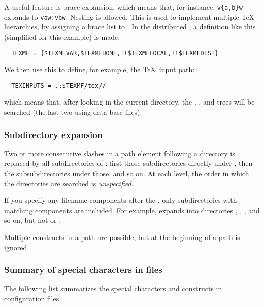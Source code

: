 \documentclass{article}
\begin{document}
A useful feature is brace expansion, which means that, for instance,
\verb+v{a,b}w+ expands to \verb+vaw:vbw+. Nesting is allowed.
This is used to implement multiple \TeX{} hierarchies, by
assigning a brace list to .
In the distributed , a definition like this
(simplified for this example) is made:
\begin{verbatim}
  TEXMF = {$TEXMFVAR,$TEXMFHOME,!!$TEXMFLOCAL,!!$TEXMFDIST}
\end{verbatim}
We then use this to define, for example, the \TeX\ input path:
\begin{verbatim}
  TEXINPUTS = .;$TEXMF/tex//
\end{verbatim}
which means that, after looking in the current directory, the
, , 
and  trees will be searched (the
last two using  data base files).

\subsubsection{Subdirectory expansion}
\label{sec:subdirectory-expansion}

Two or more consecutive slashes in a path element following a directory
 is replaced by all subdirectories of : first those
subdirectories directly under , then the subsubdirectories under
those, and so on.  At each level, the order in which the directories are
searched is \emph{unspecified}.

If you specify any filename components after the \samp{//}, only
subdirectories with matching components are included.  For example,
 expands into directories , ,
, and so on, but not  or .

Multiple \samp{//} constructs in a path are possible, but
\samp{//} at the beginning of a path is ignored.

\subsubsection{Summary of special characters in  files}
\label{sec:cnf-special-chars}

The following list summarizes the special characters and constructs in
\KPS{} configuration files.
\end{document}
